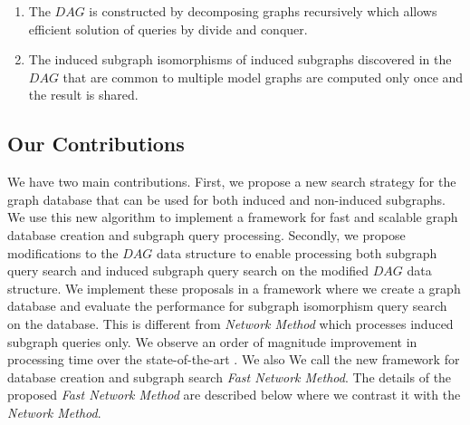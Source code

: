 \begin{enumerate}
\item The $DAG$ is constructed by decomposing graphs recursively which allows efficient solution of queries by divide and conquer.
\item The induced subgraph isomorphisms of induced subgraphs discovered in the $DAG$ that are common to multiple model graphs are computed only once and the result is shared.
\end{enumerate}

\subsection{Our Contributions}
We have two main contributions. 
First, we propose a new search strategy for the graph database that can be used for both induced and non-induced subgraphs. 
We use this new algorithm to implement a framework for fast and scalable graph database creation and subgraph query processing. 
Secondly, we propose modifications to the $DAG$ data structure to enable processing both subgraph query search and induced subgraph query search on the modified $DAG$ data structure. 
We implement these proposals in a framework where we create a graph database and evaluate the performance for subgraph isomorphism query search on the database. This is different from \textit{Network Method} which processes induced subgraph queries only. 
We observe an order of magnitude improvement in processing time over the state-of-the-art .  
We also 
We call the new framework for database creation and subgraph search \textit{Fast Network Method}. 
The details of the proposed \textit{Fast Network Method} are described below where we contrast it with the \textit{Network Method}.





